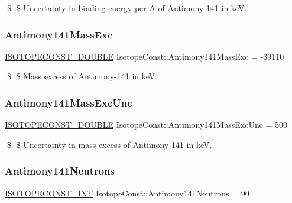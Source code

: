 \$ \$ Uncertainty in binding energy per A of Antimony-\/141 in keV. \mbox{\label{group___isotope_const-_antimony-_sb141_ga37d1d6a9b49717ce45fce26d493c6e30}} 
\subsubsection{\texorpdfstring{Antimony141\+Mass\+Exc}{Antimony141MassExc}}
{\footnotesize\ttfamily \mbox{\hyperlink{group___isotope_const-_macros_ga8f45a7272ce02c0b4c65c44636ed719a}{I\+S\+O\+T\+O\+P\+E\+C\+O\+N\+S\+T\+\_\+\+D\+O\+U\+B\+LE}} Isotope\+Const\+::\+Antimony141\+Mass\+Exc = -\/39110}

\$ \$ Mass excess of Antimony-\/141 in keV. \mbox{\label{group___isotope_const-_antimony-_sb141_ga685cc2fc210fbb25879024a1059c068b}} 
\subsubsection{\texorpdfstring{Antimony141\+Mass\+Exc\+Unc}{Antimony141MassExcUnc}}
{\footnotesize\ttfamily \mbox{\hyperlink{group___isotope_const-_macros_ga8f45a7272ce02c0b4c65c44636ed719a}{I\+S\+O\+T\+O\+P\+E\+C\+O\+N\+S\+T\+\_\+\+D\+O\+U\+B\+LE}} Isotope\+Const\+::\+Antimony141\+Mass\+Exc\+Unc = 500}

\$ \$ Uncertainty in mass excess of Antimony-\/141 in keV. \mbox{\label{group___isotope_const-_antimony-_sb141_gafe6ce650c870d1fc076a7fe06c861a8a}} 
\subsubsection{\texorpdfstring{Antimony141\+Neutrons}{Antimony141Neutrons}}
{\footnotesize\ttfamily \mbox{\hyperlink{group___isotope_const-_macros_ga5f18360b3e99483a35c32d789e62621c}{I\+S\+O\+T\+O\+P\+E\+C\+O\+N\+S\+T\+\_\+\+I\+NT}} Isotope\+Const\+::\+Antimony141\+Neutrons = 90}

